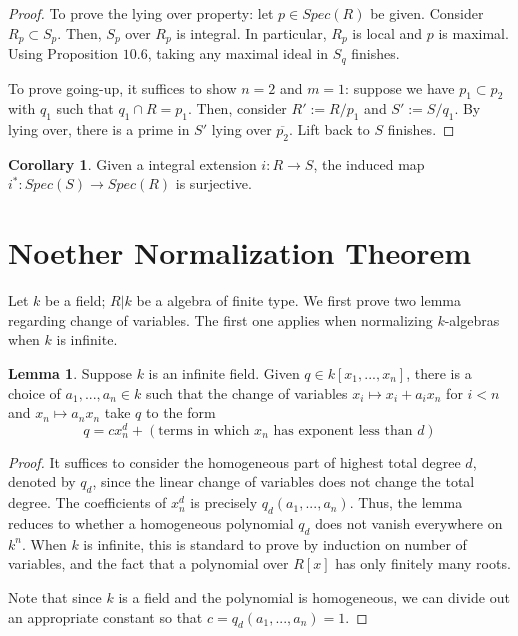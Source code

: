 \documentclass{article}
\theoremstyle{definition}
\theoremstyle{definition}
\theoremstyle{definition}
\theoremstyle{definition}
\newtheorem{lemma}[theorem]{Lemma}
\theoremstyle{definition}
\theoremstyle{definition}
\newtheorem{corollary}{Corollary}[theorem]
\theoremstyle{definition}
\begin{document}
\begin{proof}
   To prove the lying over property: let $p\in Spec(R)$ be given. Consider $R_p\subset S_p$. Then, $S_p$ over $R_p$ is integral. In particular, $R_p$ is local and $p$ is maximal. Using Proposition $10.6$, taking any maximal ideal in $S_q$ finishes. 

   To prove going-up, it suffices to show $n=2$ and $m=1$: suppose we have $p_1\subset p_2$ with $q_1$ such that $q_1\cap R=p_1$. Then, consider $R':=R/p_1$ and $S':=S/q_1$. By lying over, there is a prime in $S'$ lying over $\overline{p_2}$. Lift back to $S$ finishes.
   
   
   

\end{proof}


\begin{tcolorbox}[colback=green!5!white,colframe=green!30!white]
\begin{corollary}
Given a integral extension $i: R\to S$, the induced map $i^*: Spec(S)\to Spec(R)$ is surjective.
\end{corollary}
\end{tcolorbox}


\section{Noether Normalization Theorem}
Let $k$ be a field; $R|k$ be a algebra of finite type. We first prove two lemma regarding change of variables. The first one applies when normalizing $k$-algebras when $k$ is infinite.


\begin{tcolorbox}
\begin{lemma}
Suppose $k$ is an infinite field. Given $q\in k[x_1,...,x_n]$, there is a choice of $a_1,...,a_n\in k$ such that the change of variables $x_i\mapsto x_i+a_ix_n$ for $i<n$ and $x_n\mapsto a_nx_n$ take $q$ to the form 
\[q=cx_n^{d}+(\textrm{terms in which }x_n\textrm{ has exponent less than }d)\]
\end{lemma}
\end{tcolorbox}
\begin{proof}
    It suffices to consider the homogeneous part of highest total degree $d$, denoted by $q_d$, since the linear change of variables does not change the total degree. The coefficients of $x_n^d$ is precisely $q_d(a_1,...,a_n)$. Thus, the lemma reduces to whether a homogeneous polynomial $q_d$ does not vanish everywhere on $k^n$. When $k$ is infinite, this is standard to prove by induction on number of variables, and the fact that a polynomial over $R[x]$ has only finitely many roots.

    Note that since $k$ is a field and the polynomial is homogeneous, we can divide out an appropriate constant so that $c=q_d(a_1,...,a_n)=1$.
\end{proof}
\end{document}
